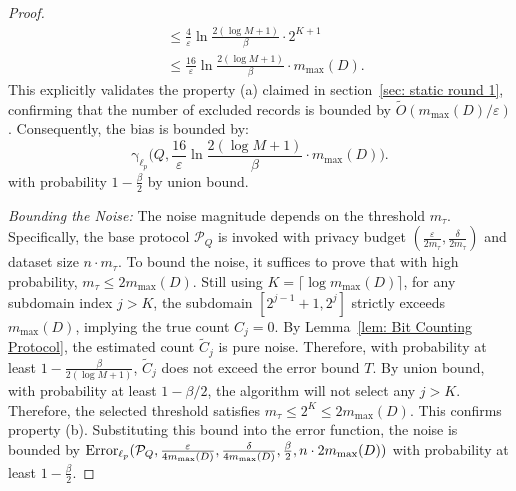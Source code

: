 \begin{proof}
$$\begin{aligned}
&\le \frac{4}{\varepsilon}\ln\frac{2(\log M +1)}{\beta} \cdot 2^{K+1} \\
&\le \frac{16}{\varepsilon}\ln\frac{2(\log M +1)}{\beta} \cdot m_{\max}(D).
\end{aligned}$$
This explicitly validates the property (a) claimed in section~\ref{sec: static round 1}, confirming that the number of excluded records is bounded by $\tilde{O}(m_{\max}(D)/\varepsilon)$.
Consequently, the bias is bounded by: $$\mathrm{\gamma}_{\ell_p}\big(Q, \frac{16}{\varepsilon}\ln\frac{2(\log M +1)}{\beta} \cdot m_{\max}(D)\big).$$
with probability $1-\frac{\beta}{2}$ by union bound.



\textit{Bounding the Noise:} 
The noise magnitude depends on the threshold $m_\tau$. Specifically, the base protocol $\mathcal{P}_Q$ is invoked with privacy budget $(\frac{\varepsilon}{2m_\tau},\frac{\delta}{2m_\tau})$ and dataset size $n \cdot m_\tau$. To bound the noise, it suffices to prove that with high probability, $m_\tau \le 2m_{\max}(D)$.
Still using $K = \lceil \log m_{\max}(D) \rceil$, for any subdomain index $j > K$, the subdomain $[2^{j-1}+1, 2^j]$ strictly exceeds $m_{\max}(D)$, implying the true count $C_j=0$. By Lemma~\ref{lem: Bit Counting Protocol}, the estimated count $\tilde{C}_j$ is pure noise. Therefore, with probability at least $1-\frac{\beta}{2(\log M +1)}$, $\tilde{C}_j$ does not exceed the error bound $T$.
By union bound, with probability at least $1-\beta/2$, the algorithm will not select any $j > K$. Therefore, the selected threshold satisfies $m_\tau \le 2^K \le 2 m_{\max}(D)$.
{This confirms property (b).}
Substituting this bound into the error function, the noise is bounded by $\mathrm{Error}_{\ell_p}(\mathcal{P}_Q,\frac{\varepsilon}{4m_{\max}(D)},\frac{\delta}{4m_{\max}(D)},\frac{\beta}{2}, n\cdot 2m_{\max}(D))$ with probability at least $1-\frac{\beta}{2}$.


\end{proof}
